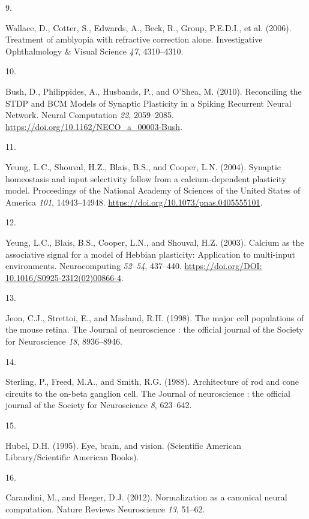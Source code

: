 \documentclass[
]{article}
\newlength{\cslhangindent}
\newlength{\csllabelwidth}
\newenvironment{CSLReferences}[2] %
 {\begin{list}{}{%
  \setlength{\itemindent}{0pt}
  \setlength{\leftmargin}{0pt}
  \setlength{\parsep}{0pt}
  \ifodd #1
   \setlength{\leftmargin}{\cslhangindent}
   \setlength{\itemindent}{-1\cslhangindent}
  \fi
  \setlength{\itemsep}{#2\baselineskip}}}
 {\end{list}}
\newcommand{\CSLLeftMargin}[1]{\parbox[t]{\csllabelwidth}{\strut#1\strut}}
\newcommand{\CSLRightInline}[1]{\parbox[t]{\linewidth - \csllabelwidth}{\strut#1\strut}}
\begin{document}
\begin{CSLReferences}{0}{1}
\CSLLeftMargin{9. }%
\CSLRightInline{Wallace, D., Cotter, S., Edwards, A., Beck, R., Group,
P.E.D.I., et al. (2006). Treatment of amblyopia with refractive
correction alone. Investigative Ophthalmology \& Visual Science
\emph{47}, 4310--4310.}

\CSLLeftMargin{10. }%
\CSLRightInline{Bush, D., Philippides, A., Husbands, P., and O'Shea, M.
(2010). Reconciling the {STDP} and {BCM Models} of {Synaptic Plasticity}
in a {Spiking Recurrent Neural Network}. Neural Computation \emph{22},
2059--2085. \url{https://doi.org/10.1162/NECO_a_00003-Bush}.}

\CSLLeftMargin{11. }%
\CSLRightInline{Yeung, L.C., Shouval, H.Z., Blais, B.S., and Cooper,
L.N. (2004). Synaptic homeostasis and input selectivity follow from a
calcium-dependent plasticity model. Proceedings of the National Academy
of Sciences of the United States of America \emph{101}, 14943--14948.
\url{https://doi.org/10.1073/pnas.0405555101}.}

\CSLLeftMargin{12. }%
\CSLRightInline{Yeung, L.C., Blais, B.S., Cooper, L.N., and Shouval,
H.Z. (2003). Calcium as the associative signal for a model of {Hebbian}
plasticity: Application to multi-input environments. Neurocomputing
\emph{52--54}, 437--440.
\href{https://doi.org/DOI:\%2010.1016/S0925-2312(02)00866-4}{https://doi.org/DOI:
10.1016/S0925-2312(02)00866-4}.}

\CSLLeftMargin{13. }%
\CSLRightInline{Jeon, C.J., Strettoi, E., and Masland, R.H. (1998). The
major cell populations of the mouse retina. The Journal of neuroscience
: the official journal of the Society for Neuroscience \emph{18},
8936--8946.}

\CSLLeftMargin{14. }%
\CSLRightInline{Sterling, P., Freed, M.A., and Smith, R.G. (1988).
Architecture of rod and cone circuits to the on-beta ganglion cell. The
Journal of neuroscience : the official journal of the Society for
Neuroscience \emph{8}, 623--642.}

\CSLLeftMargin{15. }%
\CSLRightInline{Hubel, D.H. (1995). Eye, brain, and vision. (Scientific
American Library/Scientific American Books).}

\CSLLeftMargin{16. }%
\CSLRightInline{Carandini, M., and Heeger, D.J. (2012). Normalization as
a canonical neural computation. Nature Reviews Neuroscience \emph{13},
51--62.}


\end{CSLReferences}
\end{document}
